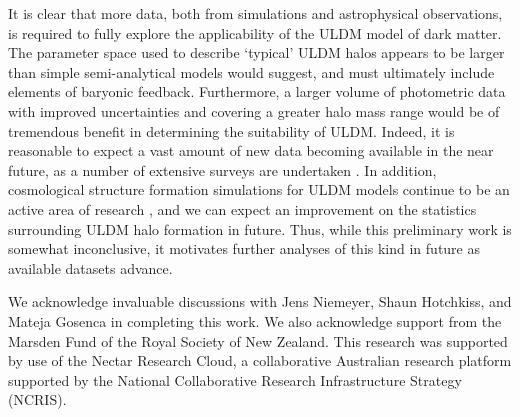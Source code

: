 \documentclass[a4paper,11pt]{article}
\begin{document}
It is clear that more data, both from simulations and astrophysical observations, is required to fully explore the applicability of the ULDM model of dark matter. The parameter space used to describe `typical' ULDM halos appears to be larger than simple semi-analytical models would suggest, and must ultimately include elements of baryonic feedback. Furthermore, a larger volume of photometric data with improved uncertainties and covering a greater halo mass range would be of tremendous benefit in determining the suitability of ULDM. Indeed, it is reasonable to expect a vast amount of new data becoming available in the near future, as a number of extensive surveys are undertaken \cite{Simon:2019kmm}. In addition, cosmological structure formation simulations for ULDM models continue to be an active area of research \cite{Lin:2018whl, Clough:2018exo, Mocz:2015sda}, and we can expect an improvement on the statistics surrounding ULDM halo formation in future. Thus, while this preliminary work is somewhat inconclusive, it motivates further analyses of this kind in future as available datasets advance. 




\acknowledgments

We acknowledge invaluable discussions with Jens Niemeyer, Shaun Hotchkiss, and Mateja Gosenca in completing this work. We also acknowledge support from the Marsden Fund of the Royal Society of New Zealand. This research was supported by use of the Nectar Research Cloud, a collaborative Australian research platform supported by the National Collaborative Research Infrastructure Strategy (NCRIS).



 
\end{document}
